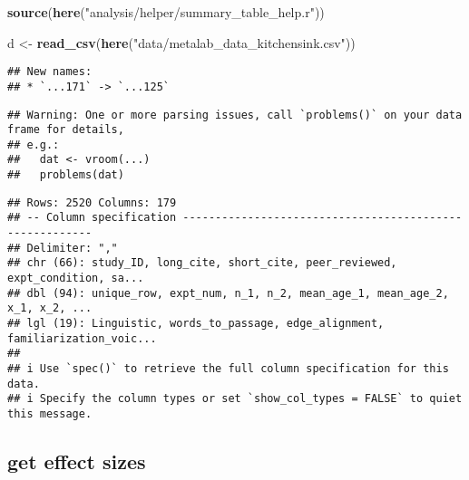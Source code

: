 \documentclass[
]{article}
\newenvironment{Shaded}{\begin{snugshade}}{\end{snugshade}}
\newcommand{\FunctionTok}[1]{\textcolor[rgb]{0.13,0.29,0.53}{\textbf{#1}}}
\newcommand{\NormalTok}[1]{#1}
\newcommand{\OtherTok}[1]{\textcolor[rgb]{0.56,0.35,0.01}{#1}}
\newcommand{\StringTok}[1]{\textcolor[rgb]{0.31,0.60,0.02}{#1}}
\begin{document}
\begin{Shaded}
\begin{Highlighting}[]
\FunctionTok{source}\NormalTok{(}\FunctionTok{here}\NormalTok{(}\StringTok{"analysis/helper/summary\_table\_help.r"}\NormalTok{))}

\NormalTok{d }\OtherTok{\textless{}{-}} \FunctionTok{read\_csv}\NormalTok{(}\FunctionTok{here}\NormalTok{(}\StringTok{"data/metalab\_data\_kitchensink.csv"}\NormalTok{)) }
\end{Highlighting}
\end{Shaded}

\begin{verbatim}
## New names:
## * `...171` -> `...125`
\end{verbatim}

\begin{verbatim}
## Warning: One or more parsing issues, call `problems()` on your data frame for details,
## e.g.:
##   dat <- vroom(...)
##   problems(dat)
\end{verbatim}

\begin{verbatim}
## Rows: 2520 Columns: 179
## -- Column specification --------------------------------------------------------
## Delimiter: ","
## chr (66): study_ID, long_cite, short_cite, peer_reviewed, expt_condition, sa...
## dbl (94): unique_row, expt_num, n_1, n_2, mean_age_1, mean_age_2, x_1, x_2, ...
## lgl (19): Linguistic, words_to_passage, edge_alignment, familiarization_voic...
## 
## i Use `spec()` to retrieve the full column specification for this data.
## i Specify the column types or set `show_col_types = FALSE` to quiet this message.
\end{verbatim}

\hypertarget{get-effect-sizes}{%
\subsection{get effect sizes}\label{get-effect-sizes}}
\end{document}
